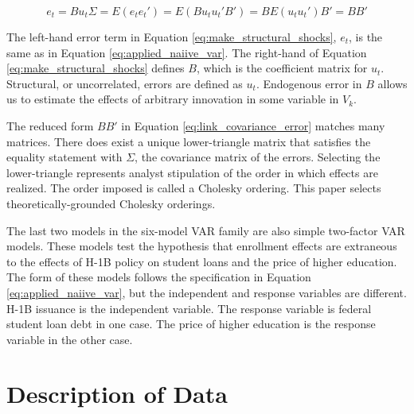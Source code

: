 \documentclass[review]{elsarticle}
\begin{document}
\begin{subequations}
    \begin{equation}
        e_t = Bu_t
        \label{eq:make_structural_shocks}
    \end{equation}
    \begin{equation}
        \Sigma = E(e_t e_t')
        = E(Bu_tu_t'B')
        = B E(u_t u_t') B'
        = B B'
        \label{eq:link_covariance_error}
    \end{equation}
\end{subequations}

The left-hand error term in Equation \ref{eq:make_structural_shocks}, $e_t$,
is the same as in Equation \ref{eq:applied_naiive_var}.
The right-hand of Equation \ref{eq:make_structural_shocks} defines $B$,
which is the coefficient matrix for $u_t$.
Structural, or uncorrelated, errors are defined as $u_t$.
Endogenous error in $B$ allows us to estimate the effects of arbitrary innovation in some variable in $V_k$.

The reduced form $BB'$ in Equation \ref{eq:link_covariance_error} matches many matrices.
There does exist a unique lower-triangle matrix that satisfies
the equality statement with $\Sigma$, the covariance matrix of the errors.
Selecting the lower-triangle represents analyst stipulation of the order in which effects are realized.
The order imposed is called a Cholesky ordering.
This paper selects theoretically-grounded Cholesky orderings.

The last two models in the six-model VAR family are also simple two-factor VAR models.
These models test the hypothesis that enrollment effects are extraneous
to the effects of H-1B policy on student loans and the price of higher education.
The form of these models follows the specification in Equation \ref{eq:applied_naiive_var},
but the independent and response variables are different.
H-1B issuance is the independent variable.
The response variable is federal student loan debt in one case.
The price of higher education is the response variable in the other case.

\section{Description of Data}
\end{document}

